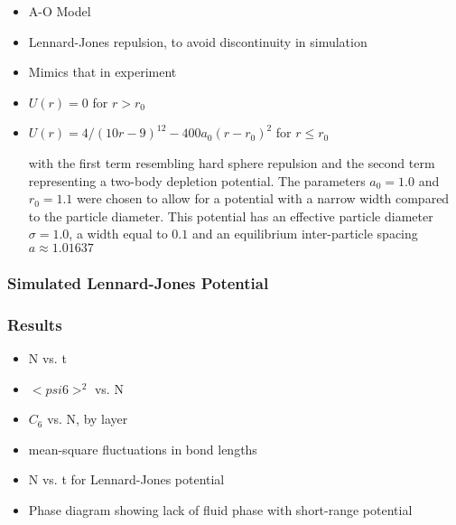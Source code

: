 \documentclass[11pt]{article}
\begin{document}
\begin{itemize}

\item A-O Model\\
\label{sec-2.3.4.1}


\item Lennard-Jones repulsion, to avoid discontinuity in simulation\\
\label{sec-2.3.4.2}


\item Mimics that in experiment\\
\label{sec-2.3.4.3}


\item $U(r)=0$ for $r > r_0$\\
\label{sec-2.3.4.4}


\item $U(r)=4/(10r-9)^{12} -  400 a_0 (r-r_0)^2$ for $r \le r_0$\\
\label{sec-2.3.4.5}

with the first term resembling hard sphere repulsion and the second term  representing a two-body depletion potential. The parameters $a_0=1.0$ and $r_0=1.1$ were chosen to allow for  a potential with a narrow width compared to the particle diameter. This potential has an effective particle diameter $\sigma=1.0$,  a width equal to $0.1$ and an equilibrium inter-particle spacing $a \approx 1.01637$

\end{itemize} %
\subsubsection{Simulated Lennard-Jones Potential}
\label{sec-2.3.5}

\subsubsection{Results}
\label{sec-2.3.6}

\begin{itemize}

\item N vs. t\\
\label{sec-2.3.6.1}


\item $< psi6 >^2$ vs. N\\
\label{sec-2.3.6.2}


\item $C_6$ vs. N, by layer\\
\label{sec-2.3.6.3}


\item mean-square fluctuations in bond lengths\\
\label{sec-2.3.6.4}


\item N vs. t for Lennard-Jones potential\\
\label{sec-2.3.6.5}


\item Phase diagram showing lack of fluid phase with short-range potential\\
\label{sec-2.3.6.6}

\end{itemize} %
\end{document}
